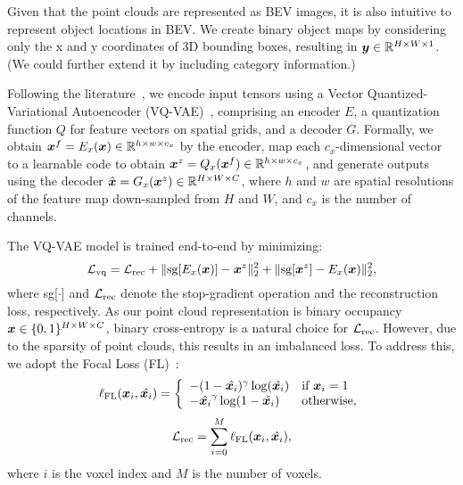  Given that the point clouds are represented as BEV images, it is also intuitive to represent object locations in BEV. We create binary object maps by considering only the x and y coordinates of 3D bounding boxes, resulting in ${\bm{y}} \in {\mathbb{R}}^{H \times W \times 1}$. (We could further extend it by including category information.)

 Following the literature~\citep{rombach2022high}, we encode input tensors using a Vector Quantized-Variational Autoencoder (VQ-VAE)~\citep{van2017neural}, comprising an encoder $E$, a quantization function $Q$ for feature vectors on spatial grids, and a decoder $G$. Formally, we obtain ${\bm{x}}^f=E_x({\bm{x}}) \in {\mathbb{R}}^{h \times w \times c_x}$ by the encoder, map each $c_x$-dimensional vector to a learnable code to obtain ${\bm{x}}^z=Q_x({\bm{x}}^f) \in {\mathbb{R}}^{h \times w \times c_x}$, and generate outputs using the decoder $\hat{{\bm{x}}}=G_x({\bm{x}}^z) \in {\mathbb{R}}^{H \times W \times C}$, where $h$ and $w$ are spatial resolutions of the feature map down-sampled from $H$ and $W$, and $c_x$ is the number of channels. 

The VQ-VAE model is trained end-to-end by minimizing:
\begin{equation}
    \mathcal{L}_{\text{vq}} = \mathcal{L}_{\text{rec}} + \lVert\text{sg}[E_x({\bm{x}})] - {\bm{x}}^z\rVert^2_2 + \lVert\text{sg}[{\bm{x}}^z] - E_x({\bm{x}})\rVert^2_2,
\label{eq:vqvae}
\end{equation}
where {sg[$\cdot$]} and $\mathcal{L}_{\text{rec}}$ denote the stop-gradient operation and the reconstruction loss, respectively.
As our point cloud representation is binary occupancy ${\bm{x}} \in \{0, 1\}^{H\times W\times C}$, binary cross-entropy is a natural choice for $\mathcal{L}_{\text{rec}}$. However, due to the sparsity of point clouds, this results in an imbalanced loss. To address this, we adopt the Focal Loss (FL)~\citep{ross2017focal}:
\begin{equation}
    \ell_{\text{FL}}({\bm{x}}_i, \hat{{\bm{x}}_i})=\left\{
    \begin{array}{ll}
        -(1-\hat{{\bm{x}}_i})^{\gamma}\log(\hat{{\bm{x}}_i}) & \text{if } {\bm{x}}_i=1 \\
        -\hat{{\bm{x}}_i}^{\gamma}\log(1-\hat{{\bm{x}}_i}) & \text{otherwise}, \\
    \end{array} 
    \right.
\label{eq:focal}
\end{equation}
\begin{equation}
    \mathcal{L}_{\text{rec}} =\sum_{i=0}^{M}\ell_{\text{FL}}({\bm{x}}_i, \hat{{\bm{x}}_i}),
\label{eq:rec}
\end{equation}
where $i$ is the voxel index and $M$ is the number of voxels.

